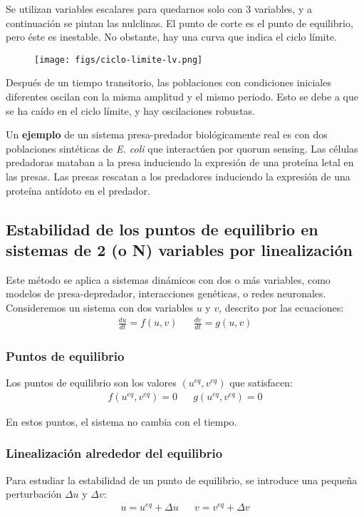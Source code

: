 Se utilizan variables escalares para quedarnos solo con 3 variables, y a continuación se pintan las nulclinas. El punto de corte es el punto de equilibrio, pero éste es inestable. No obstante, hay una curva que indica el ciclo límite. 

\begin{figure}[h]
\centering
\texttt{[image: figs/ciclo-limite-lv.png]}
\end{figure}

Después de un tiempo transitorio, las poblaciones con condiciones iniciales diferentes oscilan con la misma amplitud y el mismo periodo. Esto se debe a que se ha caído en el ciclo límite, y hay oscilaciones robustas. 

Un \textbf{ejemplo} de un sistema presa-predador biológicamente real es con dos poblaciones sintéticas de \textit{E. coli} que interactúen por quorum sensing. Las células predadoras mataban a la presa induciendo la expresión de una proteína letal en las presas. Las presas rescatan a los predadores induciendo la expresión de una proteína antídoto en el predador. 

\subsection{Estabilidad de los puntos de equilibrio en sistemas de 2 (o N) variables por linealización}
Este método se aplica a sistemas dinámicos con dos o más variables, como modelos de presa-depredador, interacciones genéticas, o redes neuronales. Consideremos un sistema con dos variables $u$ y $v$, descrito por las ecuaciones:
\begin{align*}
\frac{du}{dt} = f(u, v) && \frac{dv}{dt} = g(u, v)
\end{align*}

\subsubsection{Puntos de equilibrio}
Los puntos de equilibrio son los valores $(u^{eq}, v^{eq})$ que satisfacen:
\begin{align*}
f(u^{eq}, v^{eq}) = 0 && g(u^{eq}, v^{eq}) = 0
\end{align*}

En estos puntos, el sistema no cambia con el tiempo.

\subsubsection{Linealización alrededor del equilibrio}
Para estudiar la estabilidad de un punto de equilibrio, se introduce una pequeña perturbación $\Delta u$ y $\Delta v$:
\begin{align*}
u = u^{eq} + \Delta u && v = v^{eq} + \Delta v
\end{align*}

